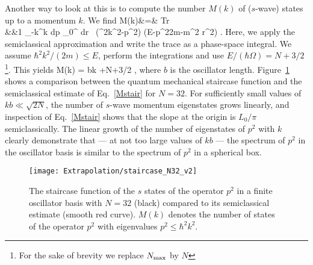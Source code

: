 	Another way to look at this is to compute the number $M(k)$ of ($s$-wave)
	states up to a momentum $k$.  We find
	\bea
	  M(k)&=& {\rm Tr} 
	  \nonumber\\
	  &\approx&{1\pi\hbar} \int\limits_{-\hbar k}^{\hbar k}\! dp
	  \int\limits_0^\infty\! dr \,
	   \Theta\left(\hbar^2k^2-p^2\right)
	   \Theta\left(E-{p^2\over 2m}-{m}\Omega^2 r^2\right)
	   \; .
	\eea
	Here, we apply the semiclassical approximation and write the trace
	as a phase-space integral.  We assume $\hbar^2k^2/(2m)\le
	E$, perform the integrations and use $E/(\hbar\Omega)= N+3/2$
	\footnote{For the sake of brevity we replace ${N_{\mathrm{max}}}$ by $N$}. This
	yields
	\bea
	  M(k) = {bk\pi}
	   +{N+3/2\over \pi}
	  \;,
	  \label{Mstair}
	\eea
	where $b$ is the oscillator length.
	Figure~\ref{fig:staircase} shows a comparison between the quantum
	mechanical staircase function and the semiclassical
	estimate of Eq.~\eqref{Mstair} for $N=32$.  For sufficiently small values of
	$kb\ll\sqrt{2N}$, the number of $s$-wave momentum eigenstates grows
	linearly, and inspection of Eq.~\eqref{Mstair} shows that the slope at
	the origin is $L_0/\pi$ semiclassically.  The linear growth of the
	number of eigenstates of $p^2$ with $k$ clearly demonstrate that --- at
	not too large values of $kb$ --- the spectrum of $p^2$ in the oscillator
	basis is similar to the spectrum of $p^2$ in a spherical
	box.
	\begin{figure}[h]
	\centering
	\texttt{[image: Extrapolation/staircase\_N32\_v2]}
	\caption{The staircase function of the $s$ states of
	  the operator $p^2$ in a finite oscillator basis with $N=32$ (black)
	  compared to its semiclassical estimate (smooth red curve). $M(k)$
	  denotes the number of states of the operator $p^2$ with eigenvalues
	  $p^2\le\hbar^2 k^2$.}
	\label{fig:staircase}
	\end{figure}

